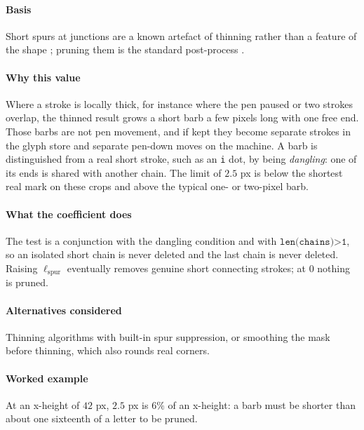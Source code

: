 \paragraph{Basis}

Short spurs at junctions are a known artefact of thinning rather than a feature of the shape \cite{lam1992}; pruning them is the standard post-process \cite{haralick1987}.

\paragraph{Why this value}

Where a stroke is locally thick, for instance where the pen paused or two strokes overlap, the thinned result grows a short barb a few pixels long with one free end. Those barbs are not pen movement, and if kept they become separate strokes in the glyph store and separate pen-down moves on the machine. A barb is distinguished from a real short stroke, such as an \texttt{i} dot, by being \emph{dangling}: one of its ends is shared with another chain. The limit of $2.5$ px is below the shortest real mark on these crops and above the typical one- or two-pixel barb.

\paragraph{What the coefficient does}

The test is a conjunction with the dangling condition and with $\texttt{len(chains)>1}$, so an isolated short chain is never deleted and the last chain is never deleted. Raising $\ell_{\text{spur}}$ eventually removes genuine short connecting strokes; at $0$ nothing is pruned.

\paragraph{Alternatives considered}

Thinning algorithms with built-in spur suppression, or smoothing the mask before thinning, which also rounds real corners.

\paragraph{Worked example}

At an x-height of $42$ px, $2.5$ px is $6\%$ of an x-height: a barb must be shorter than about one sixteenth of a letter to be pruned.

